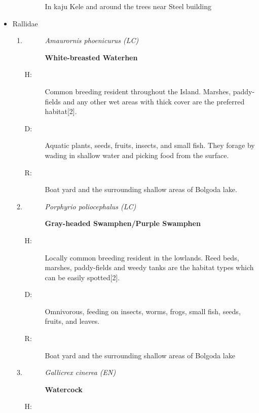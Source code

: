 \begin{itemize}
\begin{enumerate}
\begin{description}
In kaju Kele and around the trees near Steel building%
\end{description}%
\end{enumerate}%
\item%
Rallidae%
\begin{enumerate}%
\item%
\begin{description}%
\item[]%
\textit{Amaurornis phoenicurus (LC)}%
\item[]%
\textbf{White{-}breasted Waterhen}%
\end{description}%
\begin{description}%
\item[H: ]%
Common breeding resident throughout the Island. Marshes, paddy-fields and any other wet areas with thick cover are the preferred habitat{[}2{]}.%
\item[D: ]%
Aquatic plants, seeds, fruits, insects, and small fish. They forage by wading in shallow water and picking food from the surface.%
\item[R: ]%
Boat yard and the surrounding shallow areas of Bolgoda lake.%
\end{description}%
\item%
\begin{description}%
\item[]%
\textit{Porphyrio poliocephalus (LC)}%
\item[]%
\textbf{Gray{-}headed Swamphen/Purple Swamphen}%
\end{description}%
\begin{description}%
\item[H: ]%
Locally common breeding resident in the lowlands. Reed beds, marshes, paddy-fields and weedy tanks are the habitat types which can be easily spotted{[}2{]}.%
\item[D: ]%
Omnivorous, feeding on insects, worms, frogs, small fish, seeds, fruits, and leaves.%
\item[R: ]%
Boat yard and the surrounding shallow areas of Bolgoda lake%
\end{description}%
\item%
\begin{description}%
\item[]%
\textit{Gallicrex cinerea (EN)}%
\item[]%
\textbf{Watercock}%
\end{description}%
\begin{description}%
\item[H: ]%

\end{description}
\end{enumerate}
\end{itemize}
